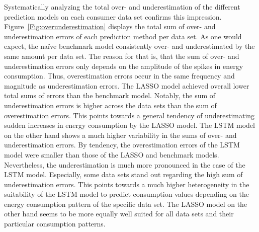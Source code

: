 Systematically analyzing the total over- and underestimation of the different prediction models on each consumer data set confirms this impression. Figure~\ref{Fig:overunderestimation} displays the total sum of over- and underestimation errors of each prediction method per data set. As one would expect, the na\"ive benchmark model consistently over- and underestimated by the same amount per data set. The reason for that is, that the sum of over- and underestimation errors only depends on the amplitude of the spikes in energy consumption. Thus, overestimation errors occur in the same frequency and magnitude as underestimation errors. The LASSO model achieved overall lower total sums of errors than the benchmark model. Notably, the sum of underestimation errors is higher across the data sets than the sum of overestimation errors. This points towards a general tendency of underestimating sudden increases in energy consumption by the LASSO model. The LSTM model on the other hand shows a much higher variability in the sums of over- and underestimation errors. By tendency, the overestimation errors of the LSTM model were smaller than those of the LASSO and benchmark models. Nevertheless, the underestimation is much more pronounced in the case of the LSTM model. Especially, some data sets stand out regarding the high sum of underestimation errors. This points towards a much higher heterogeneity in the suitability of the LSTM model to predict consumption values depending on the energy consumption pattern of the specific data set. The LASSO model on the other hand seems to be more equally well suited for all data sets and their particular consumption patterns.
%

